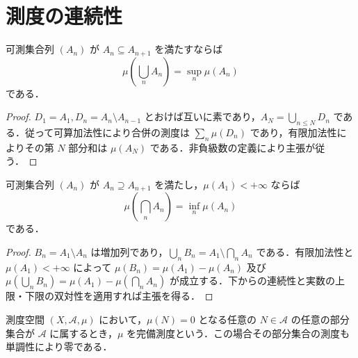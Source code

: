 \section{測度の連続性}
\begin{prop}[下からの連続性]
可測集合列 $(A_n)$ が $A_n\subseteq A_{n+1}$ を満たすならば
\[
 \mu\left(\bigcup_n A_n\right)=\sup_n\mu(A_n)
\]
である．
\end{prop}
\begin{proof}
$D_1=A_1,D_n=A_n\setminus A_{n-1}$ とおけば互いに素であり，$A_N=\bigcup_{n\leq N}D_n$ である．従って可算加法性により合併の測度は $\sum_n\mu(D_n)$ であり，有限加法性によりその第 $N$ 部分和は $\mu(A_N)$ である．非負級数の定義により主張が従う．
\end{proof}
\begin{prop}[上からの連続性]
可測集合列 $(A_n)$ が $A_n\supseteq A_{n+1}$ を満たし，$\mu(A_1)<+\infty$ ならば
\[
 \mu\left(\bigcap_n A_n\right)=\inf_n\mu(A_n)
\]
である．
\end{prop}
\begin{proof}
$B_n=A_1\setminus A_n$ は増加列であり，$\bigcup_n B_n=A_1\setminus\bigcap_n A_n$ である．有限加法性と $\mu(A_1)<+\infty$ によって $\mu(B_n)=\mu(A_1)-\mu(A_n)$ 及び $\mu(\bigcup_n B_n)=\mu(A_1)-\mu(\bigcap_n A_n)$ が成立する．下からの連続性と実数の上限・下限の双対性を適用すれば主張を得る．
\end{proof}
\begin{defn}[完備測度]
測度空間 $(X,\mathcal A,\mu)$ において，$\mu(N)=0$ となる任意の $N\in\mathcal A$ の任意の部分集合が $\mathcal A$ に属するとき，$\mu$ を完備測度という．この場合その部分集合の測度も単調性により零である．
\end{defn}
